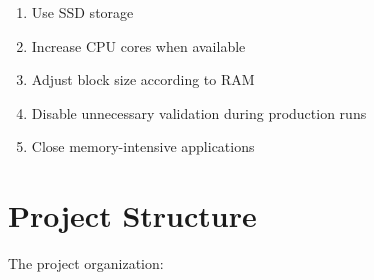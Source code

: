 \documentclass[11pt,a4paper]{article}
\begin{document}
\begin{enumerate}

\item Use SSD storage

\item Increase CPU cores when available

\item Adjust block size according to RAM

\item Disable unnecessary validation during production runs

\item Close memory-intensive applications

\end{enumerate}





\section{Project Structure}



The project organization:
\end{document}
